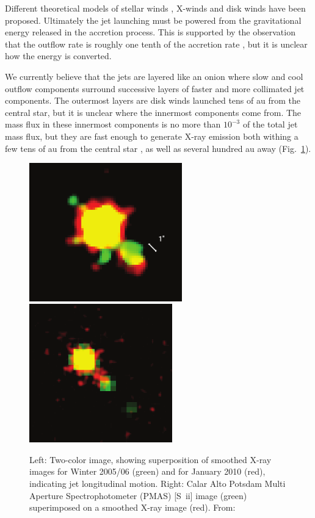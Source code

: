 \documentclass[12pt]{article}
\begin{document}
Different theoretical models of stellar winds \citep{1988ApJ...332L..41K,2005ApJ...632L.135M}, X-winds \citep{1994ApJ...429..781S} and disk winds \citep{1982MNRAS.199..883B,2005ApJ...630..945A} have been proposed. Ultimately the jet launching must be powered from the gravitational energy released in the accretion process. This is supported by the observation that the outflow rate is roughly one tenth of the accretion rate \citep{1990ApJ...354..687C,2008ApJ...689.1112C}, but it is unclear how the energy is converted.

We currently believe that the jets are layered like an onion where slow and
cool outflow components surround successive layers of faster and more
collimated jet components. The outermost layers are disk winds launched tens of
au from the central star, but it is unclear where the innermost components come
from. The mass flux in these innermost components is no more than $10^{-3}$ \citep{2009A&A...493..579G} of
the total jet mass flux, but they are fast enough to generate X-ray emission
both withing a few tens of au from the central star \citep{2008A&A...488L..13S}, as well as several hundred
au away (Fig.~\ref{fig:Xray}).


\begin{figure}[htb]
\centering
\includegraphics[height=6cm]{xjetmotion.png}
\includegraphics[height=6cm]{xjetmotion2.png}
\caption{Left: Two-color image, showing superposition of smoothed X-ray
images for Winter 2005/06 (green) and for January 2010 (red), indicating jet
longitudinal motion. Right: Calar Alto Potsdam Multi Aperture Spectrophotometer
(PMAS) [S~{\sc ii}] image (green) superimposed on a smoothed X-ray image
(red). From: }
\label{fig:Xray}
\end{figure}
\end{document}
